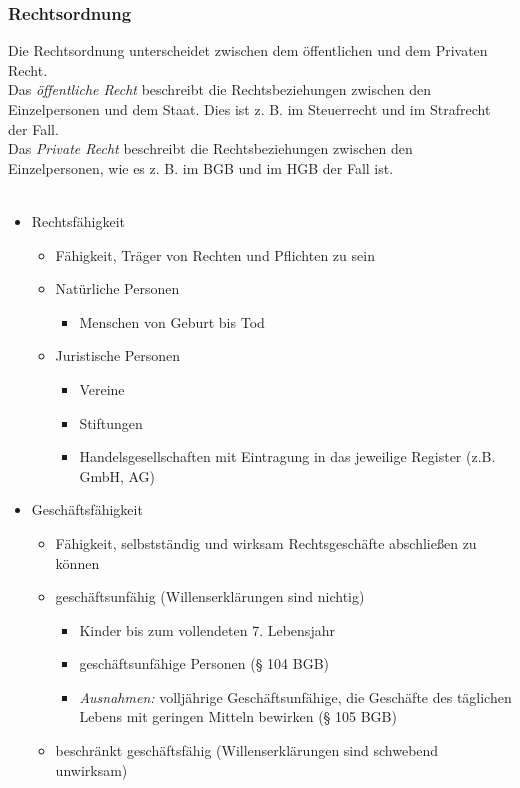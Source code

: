 \subsubsection{Rechtsordnung}
Die Rechtsordnung unterscheidet zwischen dem öffentlichen und dem Privaten Recht.\\
Das {\it öffentliche Recht} beschreibt die Rechtsbeziehungen zwischen den Einzelpersonen und dem Staat. Dies ist z. B. im Steuerrecht und im Strafrecht der Fall.\\
Das {\it Private Recht} beschreibt die Rechtsbeziehungen zwischen den Einzelpersonen, wie es z. B. im BGB und im HGB der Fall ist.\\
\\
\begin{itemize}
	\item Rechtsfähigkeit
		\begin{itemize}
			\item Fähigkeit, Träger von Rechten und Pflichten zu sein
			\item Natürliche Personen
				\begin{itemize}
					\item Menschen von Geburt bis Tod
				\end{itemize}
			\item Juristische Personen
				\begin{itemize}
					\item Vereine
					\item Stiftungen
					\item Handelsgesellschaften mit Eintragung in das jeweilige Register (z.B. GmbH, AG)
				\end{itemize}
		\end{itemize}
	\item Geschäftsfähigkeit
		\begin{itemize}
			\item Fähigkeit, selbstständig und wirksam Rechtsgeschäfte abschließen zu können
			\item geschäftsunfähig (Willenserklärungen sind nichtig)
				\begin{itemize}
					\item Kinder bis zum vollendeten 7. Lebensjahr
					\item geschäftsunfähige Personen (§ 104 BGB)
					\item {\it Ausnahmen:} volljährige Geschäftsunfähige, die Geschäfte des täglichen Lebens mit geringen Mitteln bewirken (§ 105 BGB)
				\end{itemize}
			\item beschränkt geschäftsfähig (Willenserklärungen sind schwebend unwirksam)

\end{itemize}
\end{itemize}
